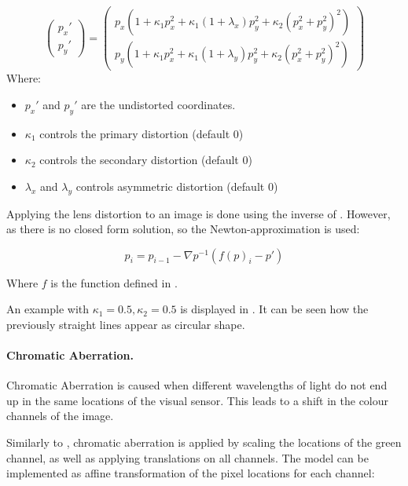 \begin{equation}
\begin{pmatrix}
	p_x' \\
	p_y'
\end{pmatrix} = \begin{pmatrix}
p_x(1 + \kappa_1 p_x^2 + \kappa_1 (1 + \lambda _x)p_y^2 + \kappa_2(p_x^2 + p_y^2)^2) \\
p_y(1 + \kappa_1 p_x^2 + \kappa_1 (1 + \lambda _y)p_y^2 + \kappa_2(p_x^2 + p_y^2)^2)
\end{pmatrix} 
\label{eq:distortion}
\end{equation}
Where:
\begin{itemize}
	\item $p_x'$ and $p_y'$ are the undistorted coordinates.
	\item $\kappa_1$ controls the primary distortion (default 0)
	\item $\kappa_2$ controls the secondary distortion (default 0)
	\item $\lambda_x$ and $\lambda_y$ controls asymmetric distortion (default 0)
\end{itemize}
 
Applying the lens distortion to an image is done using the inverse of . However, as there is no closed form solution, so the Newton-approximation is used:

\begin{equation}
	p_i = p_{i-1} - \nabla p^{-1} (f(p)_i-p')
\end{equation}

Where $f$ is the function defined in . 

An example with $\kappa_1 = 0.5, \kappa_2 = 0.5$ is displayed in . It can be seen how the previously straight lines appear as circular shape.

\paragraph{Chromatic Aberration.}

Chromatic Aberration is caused when different wavelengths of light do not end up in the same locations of the visual sensor. This leads to a shift in the colour channels of the image.

Similarly to \cite{Carlson2018}, chromatic aberration is applied by scaling the locations of the green channel, as well as applying translations on all channels. The model can be implemented as affine transformation of the pixel locations for each channel:

